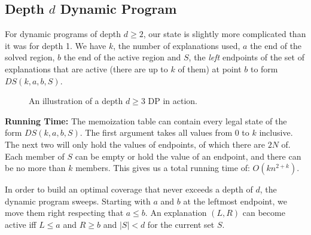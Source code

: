 \subsection{Depth $d$ Dynamic Program} \label{sec:dpFixedDepth}

For dynamic programs of depth $d \geq 2$, our state is slightly more complicated than it was for depth 1. We have $k$, the number of explanations used, $a$ the end of the solved region, $b$ the end of the active region and $S$, the {\it left} endpoints of the set of explanations that are active (there are up to $k$ of them) at point $b$ to form $DS(k,a,b,S)$.


\begin{figure}[ht!] \centering
{} 
\caption{An illustration of a depth $d \geq 3$ DP in action.}
\label{fig:dpIllustration}
\end{figure}

\FloatBarrier

{\bf Running Time:} The memoization table can contain every legal state of the form $DS(k,a,b,S)$.  The first argument takes all values from 0 to $k$ inclusive.  The next two will only hold the values of endpoints, of which there are $2N$ of.  Each member of $S$ can be empty or hold the value of an endpoint, and there can be no more than $k$ members.  This gives us a total running time of: $O(kn^{2+k})$.

In order to build an optimal coverage that never exceeds a depth of $d$, the dynamic program sweeps.  Starting with $a$ and $b$ at the leftmost endpoint, we move them right respecting that $a \leq b$.  An explanation $(L,R)$ can become active iff $L\leq a$ and $R \geq b$ and $|S|<d$ for the current set $S$.

